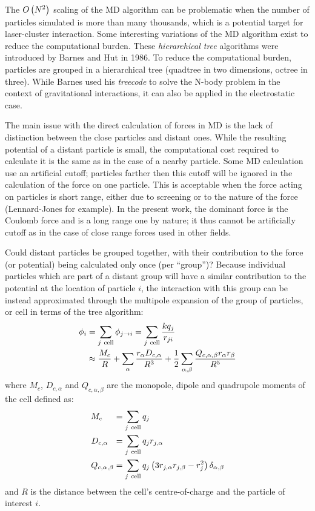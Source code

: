 The $O\left( N^2 \right)$ scaling of the MD algorithm can be problematic when the number of
particles simulated is more than many thousands, which is a potential target
for laser-cluster interaction. Some interesting variations of the MD algorithm
exist to reduce the computational burden. These \textit{hierarchical tree}
algorithms were introduced by Barnes and Hut in 1986\cite{Barnes1986}. To
reduce the computational burden, particles are grouped in a hierarchical tree
(quadtree in two dimensions, octree in three). While Barnes used his
\textit{treecode} to solve the N-body problem in the context of gravitational
interactions, it can also be applied in the electrostatic case.

The main issue with the direct calculation of forces in MD is the lack of
distinction between the close particles and distant ones. While the resulting
potential of a distant particle is small, the computational cost required to
calculate it is the same as in the case of a nearby particle. Some MD
calculation use an artificial cutoff; particles farther then this cutoff will
be ignored in the calculation of the force on one particle. This is acceptable
when the force acting on particles is short range, either due to screening or
to the nature of the force (Lennard-Jones for example).
In the present work, the dominant force is the
Coulomb force and is a long range one by nature; it thus cannot be artificially
cutoff as in the case of close range forces used in other fields.

Could distant particles be grouped together, with their contribution to the
force (or potential) being calculated only once (per ``group'')? Because
individual particles which are part of a distant group will have a similar
contribution to the potential at the location of particle $i$, the interaction
with this group can be instead approximated through the multipole
expansion\cite{Gibbon2002} of the group of particles, or cell in terms of the
tree algorithm:
\begin{align}
\phi_i & = \sum_{j~\textrm{cell}} \phi_{j \rightarrow i} = \sum_{j~{\rm cell}}
\frac{k q_j}{r_{ji}} \\
& \approx \frac{M_{c}}{R}
+ \sum_{\alpha} \frac{r_{\alpha} D_{c,\alpha}}{R^3}
+ \frac{1}{2} \sum_{\alpha,\beta} \frac{
        Q_{c,\alpha,\beta} r_{\alpha} r_{\beta}
    }{R^5}
\end{align}
where $M_{c}$, $D_{c,\alpha}$ and $Q_{c,\alpha,\beta}$ are the monopole, dipole
and quadrupole moments of the cell defined as:
\begin{subequations}
\begin{align}
M_{c}           ~~~~& = \sum_{j~\textrm{cell}} q_{j} \\
D_{c,\alpha}      ~~& = \sum_{j~\textrm{cell}} q_{j} r_{j,\alpha} \\
Q_{c,\alpha,\beta}  & = \sum_{j~\textrm{cell}} q_{j} \left( 3 r_{j,\alpha}
r_{j,\beta} - r_{j}^2 \right) \delta_{\alpha,\beta}
\end{align}
\label{eqn:tree:moments}
\end{subequations}
and $R$ is the distance between the cell's centre-of-charge and the
particle of interest $i$.

